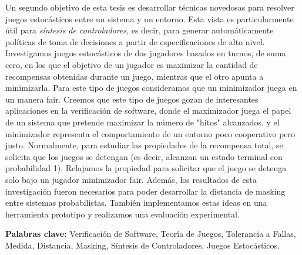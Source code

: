 Un segundo objetivo de esta tesis es desarrollar técnicas novedosas para resolver juegos estocásticos entre un sistema y un entorno. Esta vista es particularmente útil para \emph{síntesis de controladores}, es decir, para generar automáticamente políticas de toma de decisiones a partir de especificaciones de alto nivel.
Investigamos juegos estocásticos de dos jugadores basados en turnos, de suma cero, en los que el objetivo de un jugador es maximizar la cantidad de recompensas obtenidas durante un juego, mientras que el otro apunta a minimizarla. %
Para este tipo de juegos consideramos que un minimizador juega en un
manera fair. Creemos que este tipo de juegos gozan de interesantes aplicaciones en la verificación de software, donde el maximizador juega el papel de un sistema que pretende maximizar la
número de "hitos" alcanzados, y el minimizador representa el comportamiento de un entorno poco cooperativo pero justo.
Normalmente, para estudiar las propiedades de la recompensa total, se solicita que los juegos se detengan (es decir, alcanzan un estado terminal con probabilidad 1). %
Relajamos la propiedad para solicitar que el juego se detenga solo bajo un jugador minimizador fair. Además, los resultados de esta investigación fueron necesarios para poder desarrollar la distancia de masking entre sistemas probabilistas. También implementamos estas ideas en una herramienta prototipo y realizamos una evaluación experimental.

\noindent
\textbf{Palabras clave:} Verificación de Software, Teoría de Juegos, Tolerancia a Fallas, Medida, Distancia, Masking, Síntesis de Controladores, Juegos Estocásticos.